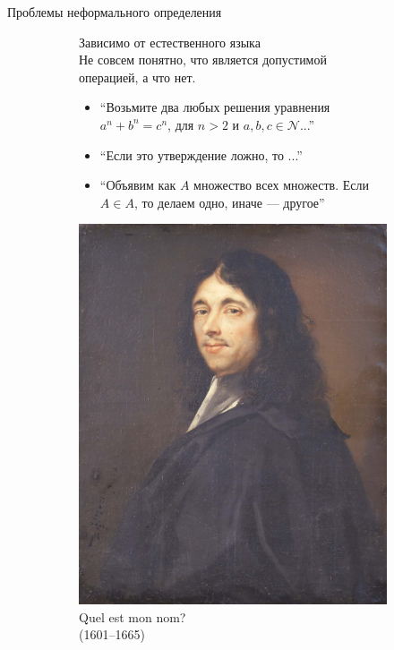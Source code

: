 \begin{frame}{Проблемы неформального определения}

\begin{figure}[ht]
  \begin{subfigure}[t]{.55\textwidth}
     \vspace{-15em}
     Зависимо от естественного языка\\

     \vspace{1em}
     Не совсем понятно, что является допустимой операцией, а что нет.
     \begin{itemize}
         \item \enquote{Возьмите два любых решения уравнения $a^n+b^n=c^n$, для $n>2$ и $a,b,c\in \mathcal{N}$...}
     	\item \enquote{Если это утверждение ложно, то ...}
     	\item \enquote{Объявим как $A$ множество всех множеств. Если $A\in A$, то делаем одно, иначе --- другое}
     \end{itemize}

  \end{subfigure}
\hspace{1cm}
  \begin{subfigure}[t]{.35\textwidth}
    \includegraphics[width=.95\textwidth]{Pierre_de_Fermat3.jpeg}\\
    \centering
    Quel est mon nom? \\(1601--1665)
  \end{subfigure}
\end{figure}

\end{frame}


